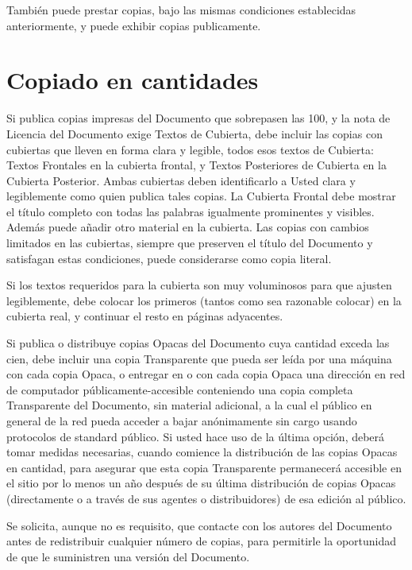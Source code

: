 También puede prestar copias, bajo las mismas condiciones establecidas
anteriormente, y puede exhibir copias publicamente.

\section{Copiado en cantidades}

Si publica copias impresas del Documento  que sobrepasen las 100, y la
nota de Licencia del Documento  exige Textos de Cubierta, debe incluir
las copias  con cubiertas que lleven  en forma clara y  legible, todos
esos textos  de Cubierta: Textos  Frontales en la cubierta  frontal, y
Textos  Posteriores  de  Cubierta  en  la  Cubierta  Posterior.  Ambas
cubiertas deben identificarlo a Usted  clara y legiblemente como quien
publica  tales copias.  La  Cubierta Frontal  debe  mostrar el  título
completo  con todas  las palabras  igualmente prominentes  y visibles.
Además puede  añadir  otro  material  en  la cubierta. Las  copias con
cambios limitados  en las cubiertas,  siempre que preserven  el título
del Documento y satisfagan  estas condiciones, puede considerarse como
copia literal.

Si los textos requeridos para la cubierta son muy voluminosos para que
ajusten  legiblemente,  debe colocar  los  primeros  (tantos como  sea
razonable  colocar) en  la  cubierta  real, y  continuar  el resto  en
páginas adyacentes.

Si  publica o  distribuye copias  Opacas del  Documento cuya  cantidad
exceda las  cien, debe  incluir una copia  Transparente que  pueda ser
leída por una máquina  con cada copia Opaca, o entregar  en o con cada
copia Opaca una dirección  en red de computador públicamente-accesible
conteniendo  una  copia  completa   Transparente  del  Documento,  sin
material adicional,  a la cual el  público en general de  la red pueda
acceder a bajar  anónimamente sin cargo usando  protocolos de standard
público. Si usted  hace uso de la última opción,  deberá tomar medidas
necesarias, cuando  comience la distribución  de las copias  Opacas en
cantidad,  para  asegurar  que  esta  copia  Transparente  permanecerá
accesible  en el  sitio  por lo  menos  un año  después  de su  última
distribución de copias Opacas (directamente  o a través de sus agentes
o distribuidores) de esa edición al público.

Se solicita, aunque no es requisito,  que contacte con los autores del
Documento  antes  de redistribuir  cualquier  número  de copias,  para
permitirle  la  oportunidad de  que  le  suministren una  versión  del
Documento.

